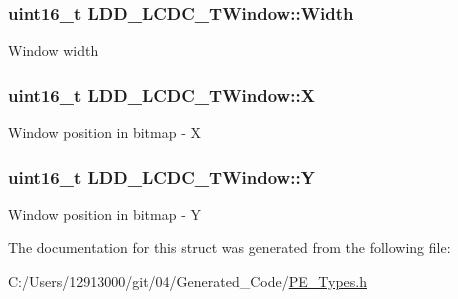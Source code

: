 \subsubsection[{Width}]{\setlength{\rightskip}{0pt plus 5cm}uint16\+\_\+t L\+D\+D\+\_\+\+L\+C\+D\+C\+\_\+\+T\+Window\+::\+Width}\label{struct_l_d_d___l_c_d_c___t_window_a53ee53813f5884a400be8ca3093233c4}
Window width \hypertarget{struct_l_d_d___l_c_d_c___t_window_a9dd1270e9794b4dbd79b2b30afca87c9}{}
\subsubsection[{X}]{\setlength{\rightskip}{0pt plus 5cm}uint16\+\_\+t L\+D\+D\+\_\+\+L\+C\+D\+C\+\_\+\+T\+Window\+::\+X}\label{struct_l_d_d___l_c_d_c___t_window_a9dd1270e9794b4dbd79b2b30afca87c9}
Window position in bitmap -\/ X \hypertarget{struct_l_d_d___l_c_d_c___t_window_af64f532d1fb5899c563ba40df90867d8}{}
\subsubsection[{Y}]{\setlength{\rightskip}{0pt plus 5cm}uint16\+\_\+t L\+D\+D\+\_\+\+L\+C\+D\+C\+\_\+\+T\+Window\+::\+Y}\label{struct_l_d_d___l_c_d_c___t_window_af64f532d1fb5899c563ba40df90867d8}
Window position in bitmap -\/ Y 

The documentation for this struct was generated from the following file\+:\begin{DoxyCompactItemize}
\item 
C\+:/\+Users/12913000/git/04/\+Generated\+\_\+\+Code/\hyperlink{_p_e___types_8h}{P\+E\+\_\+\+Types.\+h}\end{DoxyCompactItemize}
